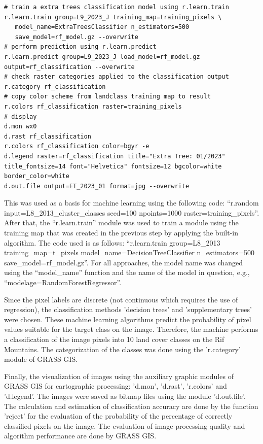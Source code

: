 \documentclass[geomatics,article,submit,pdftex,moreauthors]{Definitions/mdpi}
\begin{document}
\begin{footnotesize}
\begin{verbatim}
# train a extra trees classification model using r.learn.train
r.learn.train group=L9_2023_J training_map=training_pixels \
   model_name=ExtraTreesClassifier n_estimators=500 
   save_model=rf_model.gz --overwrite
# perform prediction using r.learn.predict
r.learn.predict group=L9_2023_J load_model=rf_model.gz  output=rf_classification --overwrite
# check raster categories applied to the classification output
r.category rf_classification
# copy color scheme from landclass training map to result
r.colors rf_classification raster=training_pixels
# display
d.mon wx0
d.rast rf_classification
r.colors rf_classification color=bgyr -e
d.legend raster=rf_classification title="Extra Tree: 01/2023" 
title_fontsize=14 font="Helvetica" fontsize=12 bgcolor=white 
border_color=white
d.out.file output=ET_2023_01 format=jpg --overwrite
\end{verbatim}
\end{footnotesize}

This was used as a basis for machine learning using the following code: “r.random input=L8\_2013\_cluster\_classes seed=100 npoints=1000 raster=training\_pixels”. After that, the “r.learn.train” module was used to train a module using the training map that was created in the previous step by applying the built-in algorithm. The code used is as follows: “r.learn.train group=L8\_2013 training\_map=t\_pixels model\_name=DecisionTreeClassifier n\_estimators=500 save\_model=rf\_model.gz”. For all approaches, the model name was changed using the “model\_name” function and the name of the model in question, e.g., “modelage=RandomForestRegressor”.

Since the pixel labels are discrete (not continuous which requires the use of regression), the classification methods 'decision trees' and 'supplementary trees' were chosen. These machine learning algorithms predict the probability of pixel values suitable for the target class on the image. Therefore, the machine performs a classification of the image pixels into 10 land cover classes on the Rif Mountains. The categorization of the classes was done using the 'r.category' module of GRASS GIS. 

Finally, the visualization of images using the auxiliary graphic modules of GRASS GIS for cartographic processing: 'd.mon', 'd.rast', 'r.colors' and 'd.legend'. The images were saved as bitmap files using the module 'd.out.file'. The calculation and estimation of classification accuracy are done by the function 'reject' for the evaluation of the probability of the percentage of correctly classified pixels on the image. The evaluation of image processing quality and algorithm performance are done by GRASS GIS.
\end{document}
